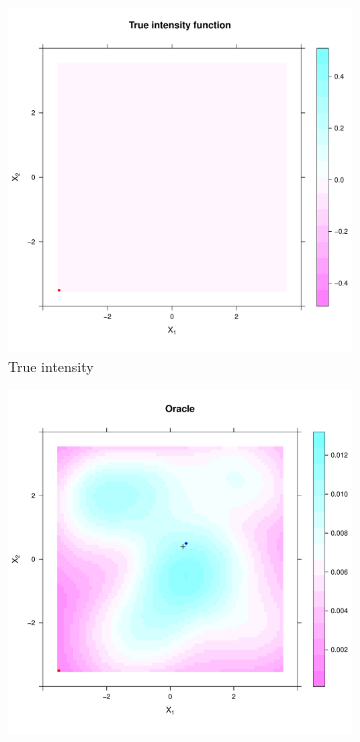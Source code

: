 \begin{figure}[tb]
    \centering
    \begin{subfigure}[t]{0.45\textwidth}
    \includegraphics[width=\textwidth]{results/unif_100_unif/output/true_intensity_heatmap}
    \caption{True intensity}
    \end{subfigure}
    \begin{subfigure}[t]{0.45\textwidth}
    \includegraphics[width=\textwidth]{results/unif_100_unif/output/oracle_intensity_heatmap}

\end{subfigure}
\end{figure}
